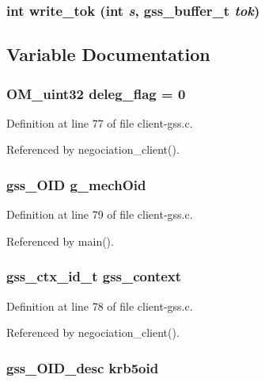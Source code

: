 \subsubsection{\setlength{\rightskip}{0pt plus 5cm}int write\_\-tok (int {\em s}, gss\_\-buffer\_\-t {\em tok})}\label{client-gss_8c_a21}




\subsection{Variable Documentation}
\subsubsection{\setlength{\rightskip}{0pt plus 5cm}OM\_\-uint32 {\bf deleg\_\-flag} = 0}\label{client-gss_8c_a16}




Definition at line 77 of file client-gss.c.

Referenced by negociation\_\-client().
\subsubsection{\setlength{\rightskip}{0pt plus 5cm}gss\_\-OID {\bf g\_\-mech\-Oid}}\label{client-gss_8c_a18}




Definition at line 79 of file client-gss.c.

Referenced by main().
\subsubsection{\setlength{\rightskip}{0pt plus 5cm}gss\_\-ctx\_\-id\_\-t {\bf gss\_\-context}}\label{client-gss_8c_a17}




Definition at line 78 of file client-gss.c.

Referenced by negociation\_\-client().
\subsubsection{\setlength{\rightskip}{0pt plus 5cm}gss\_\-OID\_\-desc {\bf krb5oid}}\label{client-gss_8c_a13}


